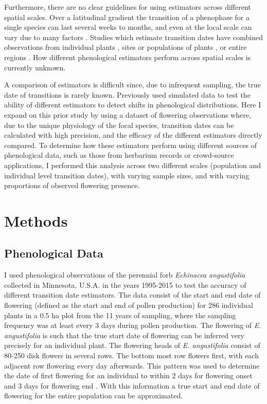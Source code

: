 Furthermore, there are no clear guidelines for using estimators across different spatial scales. Over a latitudinal gradient the transition of a phenophase for a single species can last several weeks to months, and even at the local scale can vary due to many factors \citep{diez2012, zhang2017}. Studies which estimate transition dates have combined observations from individual plants \citep{gerst2016, taylor2019}, sites or populations of plants \citep{schaber2002, linkosalo2008, basler2016}, or entire regions \citep{calinger2013, park2014}. How different phenological estimators perform across spatial scales is currently unknown. 

A comparison of estimators is difficult since, due to infrequent sampling, the true date of transitions is rarely known. Previously \cite{moussus2010} used simulated data to test the ability of different estimators to detect shifts in phenological distributions. Here I expand on this prior study by using a dataset of flowering observations where, due to the unique physiology of the focal species, transition dates can be calculated with high precision, and the efficacy of the different estimators directly compared. To determine how these estimators perform using different sources of phenological data, such as those from herbarium records or crowd-source applications, I performed this analysis across two different scales (population and individual level transition dates), with varying sample sizes, and with varying proportions of observed flowering presence.

\section{Methods}

\subsection{Phenological Data}

I used phenological observations of the perennial forb \textit{Echinacea angustifolia} collected in Minnesota, U.S.A. in the years 1995-2015 \citep{waananen2018a, waananen2018b} to test the accuracy of different transition date estimators. The data consist of the start and end date of flowering (defined as the start and end of pollen production) for 286 individual plants in a 0.5 ha plot from the 11 years of sampling, where the sampling frequency was at least every 3 days during pollen production. The flowering of \textit{E. angustifolia} is such that the true start date of flowering can be inferred very precisely for an individual plant. The flowering heads of \textit{E. angustifolia} consist of 80-250 disk flowers in several rows. The bottom most row flowers first, with each adjacent row flowering every day afterwards. This pattern was used to determine the date of first flowering for an individual to within 2 days for flowering onset and 3 days for flowering end \citep{wagenius2004, waananen2018a}. With this information a true start and end date of flowering for the entire population can be approximated.


